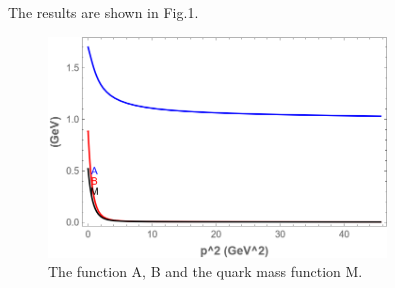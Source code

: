 \documentclass{article}
\begin{document}
The results are shown in Fig.1.
\begin{figure}[H]
    \centering
    \includegraphics[width=0.8\textwidth]{Real-dse.png}
    \caption{The function A, B and the quark mass function M.}
\end{figure}
\end{document}
